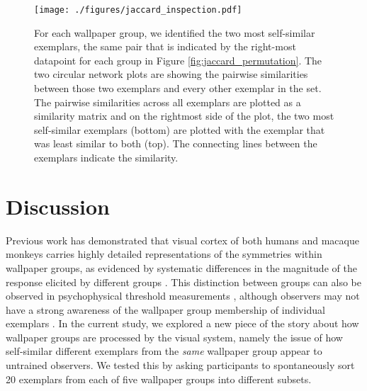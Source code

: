 \documentclass[11pt, twoside]{article}
\begin{document}
\begin{figure}[hbt!]
	\centering
	\texttt{[image: ./figures/jaccard\_inspection.pdf]}
	\caption{For each wallpaper group, we identified the two most self-similar exemplars, the same pair that is indicated by the right-most datapoint for each group in Figure \ref{fig:jaccard_permutation}. The two circular network plots are showing the pairwise similarities between those two exemplars and every other exemplar in the set. The pairwise similarities across all exemplars are plotted as a similarity matrix and on the rightmost side of the plot, the two most self-similar exemplars (bottom) are plotted with the exemplar that was least similar to both (top). The connecting lines between the exemplars indicate the similarity.}
	\label{fig:jaccard_inspection}
\end{figure}

\section*{Discussion}
Previous work has demonstrated that visual cortex of both humans and macaque monkeys carries highly detailed representations of the symmetries within wallpaper groups, as evidenced by systematic differences in the magnitude of the response elicited by different groups \citep{RN1725,kohler_clarke_2021,audurier_symmetry_2021}. This distinction between groups can also be observed in psychophysical threshold measurements \citep{kohler_clarke_2021}, although observers may not have a strong awareness of the wallpaper group membership of individual exemplars \citep{RN172}. In the current study, we explored a new piece of the story about how wallpaper groups are processed by the visual system, namely the issue of how self-similar different exemplars from the \textit{same} wallpaper group appear to untrained observers. We tested this by asking participants to spontaneously sort 20 exemplars from each of five wallpaper groups into different subsets. 
\end{document}
